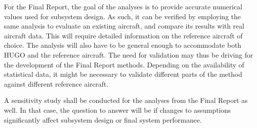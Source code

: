 For the Final Report, the goal of the analyses is to provide accurate numerical values used for subsystem design. As such, it can be verified by employing the same analysis to evaluate an existing aircraft, and compare its results with real aircraft data. This will require detailed information on the reference aircraft of choice. The analysis will also have to be general enough to accommodate both HUGO and the reference aircraft. The need for validation may thus be driving for the development of the Final Report methods. Depending on the availability of statistical data, it might be necessary to validate different parts of the method against different reference aircraft.

A sensitivity study shall be conducted for the analyses from the Final Report as well. In that case, the question to answer will be if changes to assumptions significantly affect subsystem design or final system performance.




